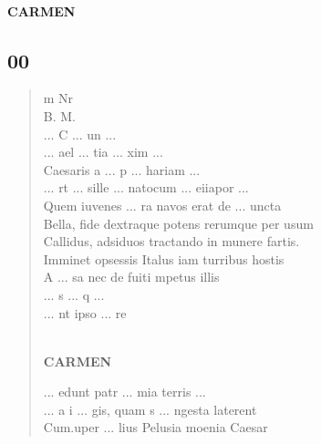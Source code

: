 \documentclass[11pt, a4paper]{report}
\begin{document}

            
        ﻿\pagebreak 
    
            \begin{center} \textbf{CARMEN} \end{center}
            \subsection*{00}
      \begin{verse}
      m Nr \\ B. M. \\ 
                     \lbrack ... \rbrack  C  \lbrack ... \rbrack  un  \lbrack ... \rbrack 
                 \\ 
                     \lbrack ... \rbrack  ael  \lbrack ... \rbrack  tia  \lbrack ... \rbrack  xim  \lbrack ... \rbrack 
                 \\ Caesaris a  \lbrack ... \rbrack  p  \lbrack ... \rbrack  hariam  \lbrack ... \rbrack 
                 \\  \lbrack ... \rbrack rt  \lbrack ... \rbrack  sille  \lbrack ... \rbrack  natocum
                         \lbrack ... \rbrack  eiiapor  \lbrack ... \rbrack 
                 \\ Quem iuvenes  \lbrack ... \rbrack  ra navos erat de  \lbrack ... \rbrack 
                    uncta \\ Bella, fide dextraque potens rerumque per usum \\ Callidus, adsiduos tractando in munere fartis. \\ Imminet opsessis Italus iam turribus hostis \\ A  \lbrack ... \rbrack  sa nec de fuiti mpetus illis \\ 
                     \lbrack ... \rbrack  s  \lbrack ... \rbrack  q  \lbrack ... \rbrack 
                 \\ 
                     \lbrack ... \rbrack  nt ipso  \lbrack ... \rbrack  re \\ 
        ﻿\pagebreak 
    \begin{center} \textbf{CARMEN} \end{center}
                     \lbrack ... \rbrack  edunt patr  \lbrack ... \rbrack  mia terris  \lbrack ... \rbrack 
                 \\ 
                     \lbrack ... \rbrack  a i  \lbrack ... \rbrack  gis, quam s  \lbrack ... \rbrack 
                    ngesta laterent \\ Cum.uper  \lbrack ... \rbrack  lius Pelusia moenia Caesar \\ 

\end{verse}
\end{document}
